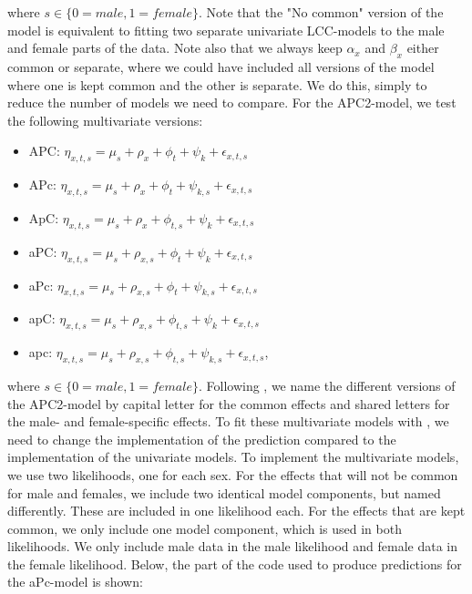 where $s \in \{0 = male, 1 = female\}$. Note that the "No common" version of the model is equivalent to fitting two separate univariate LCC-models to the male and female parts of the data. Note also that we always keep $\alpha_x$ and $\beta_x$ either common or separate, where we could have included all versions of the model where one is kept common and the other is separate. We do this, simply to reduce the number of models we need to compare. For the APC2-model, we test the following multivariate versions:
\begin{itemize}
    \item APC: $\eta_{x,t,s}= \mu_{s} + \rho_x + \phi_t + \psi_k + \epsilon_{x,t,s}$ 
    \item APc: $\eta_{x,t,s}= \mu_{s} + \rho_x + \phi_t + \psi_{k,s} + \epsilon_{x,t,s}$ 
    \item ApC: $\eta_{x,t,s}= \mu_{s} + \rho_x + \phi_{t,s} + \psi_{k} + \epsilon_{x,t,s}$ 
    \item aPC: $\eta_{x,t,s}= \mu_{s} + \rho_{x,s} + \phi_{t} + \psi_{k} + \epsilon_{x,t,s}$ 
    \item aPc: $\eta_{x,t,s}= \mu_{s} + \rho_{x,s} + \phi_{t} + \psi_{k,s} + \epsilon_{x,t,s}$ 
    \item apC: $\eta_{x,t,s}= \mu_{s} + \rho_{x,s} + \phi_{t, s} + \psi_{k} + \epsilon_{x,t,s}$ 
    \item apc: $\eta_{x,t,s}= \mu_{s} + \rho_{x,s} + \phi_{t, s} + \psi_{k, s} + \epsilon_{x,t,s}$,
\end{itemize}
where $s \in \{0 = male, 1 = female\}$. Following \textcite{rieblerHeld2010}, we name the different versions of the APC2-model by capital letter for the common effects and shared letters for the male- and female-specific effects.  
\newpar To fit these multivariate models with \inlabru, we need to change the implementation of the prediction compared to the implementation of the univariate models. To implement the multivariate models, we use two likelihoods, one for each sex. For the effects that will not be common for male and females, we include two identical model components, but named differently. These are included in one likelihood each. For the effects that are kept common, we only include one model component, which is used in both likelihoods. We only include male data in the male likelihood and female data in the female likelihood. Below, the part of the code used to produce predictions for the aPc-model is shown:


